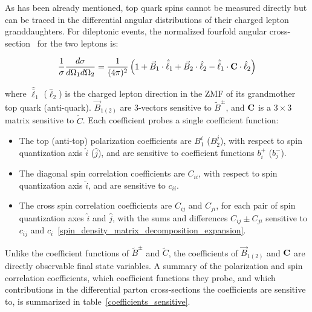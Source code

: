 \begin{refsection}
As has been already mentioned, top quark spins cannot be measured directly but can be traced in the differential angular distributions of their charged lepton granddaughters.
For \ttbar dileptonic events, the normalized fourfold angular cross-section~\cite{Bernreuther} for the two leptons is:
\begin{linenomath*}
\begin{align}
\frac{1}{\sigma} \frac{d \sigma}{d \Omega_1 d \Omega_2}=\frac{1}{(4 \pi)^2}\left(1+\vec{B}_1 \cdot \hat{\bar{\ell}}_1+\vec{B}_2 \cdot \hat{\ell}_2-\hat{\bar{\ell}}_1 \cdot \mathbf{C} \cdot \hat{\ell}_2\right)
\label{fourfold_angular_distribution}
\end{align}
\end{linenomath*}
where $\hat{\bar{\ell}}_1$ ($\hat{\ell}_2$) is the charged lepton direction in the ZMF of its grandmother top quark (anti-quark).
$\vec{B}_{1(2)}$ are 3-vectors sensitive to $\tilde{B}^\pm$, and $\mathbf{C}$ is a $3\times3$ matrix sensitive to $\tilde{C}$.
Each coefficient probes a single coefficient function:
\begin{itemize}
\item The top (anti-top) polarization coefficients are $B_1^{i}$ ($B_2^{j}$), with respect to spin quantization axis $\hat{i}$ ($\hat{j}$), and are sensitive to coefficient functions $b^+_i$ ($b^-_j$).
\item The diagonal spin correlation coefficients are $C_{ii}$, with respect to spin quantization axis $\hat{i}$, and are sensitive to $c_{ii}$.
\item The cross spin correlation coefficients are $C_{ij}$ and $C_{ji}$,  for each pair of spin quantization axes $\hat{i}$ and $\hat{j}$, with the sums and differences $C_{ij} \pm C_{ji}$ sensitive to $c_{ij}$ and $c_{i}$~\ref{spin_density_matrix_decomposition_expansion}.
\end{itemize}
Unlike the coefficient functions of $\tilde{B}^\pm$ and $\tilde{C}$, the coefficients of $\vec{B}_{1(2)}$ and $\mathbf{C}$ are directly observable final state variables.
A summary of the polarization and spin correlation coefficients, which coefficient functions they probe, and which contributions in the differential parton cross-sections the coefficients are sensitive to, is summarized in table~\ref{coefficients_sensitive}.


\end{refsection}
